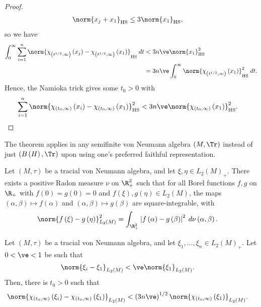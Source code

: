 \documentclass[10pt]{mypackage}
\begin{document}
\begin{proof}
  \begin{align*}
    \norm{x_j + x_1}_{\operatorname{HS}} &\leq 3\norm{x_1}_{\operatorname{HS}},
  \end{align*}
  so we have
  \begin{align*}
    \int_{0}^{\infty} \sum_{i=1}^{n}\norm{\chi_{\left( t^{1/2},\infty \right)}\left(x_j\right)-\chi_{\left( t^{1/2},\infty \right)}\left( x_1 \right)}_{\operatorname{HS}}\:dt &< 3n\ve \norm{x_1}_{\operatorname{HS}}^2\\
                                                                                                                                                                                                &= 3n\ve \int_{0}^{\infty} \norm{\chi_{\left( t^{1/2},\infty \right)}\left( x_1 \right)}_{\operatorname{HS}}^2\:dt.
  \end{align*}
  Hence, the Namioka trick gives some $t_0 > 0$ with
  \begin{align*}
    \sum_{i=1}^{n} \norm{\chi_{\left( t_0,\infty \right)}\left( x_i \right) - \chi_{\left( t_0,\infty \right)}\left( x_1 \right)}_{\operatorname{HS}}^2 &< 3n\ve\norm{\chi_{\left( t_0,\infty \right)}\left( x_1 \right)}_{\operatorname{HS}}^2.
  \end{align*}
\end{proof}
The theorem applies in any semifinite von Neumann algebra $\left( M,\Tr \right)$ instead of just $\left( B\left( H \right),\Tr \right)$ upon using one's preferred faithful representation.
\begin{proposition}
  Let $\left( M,\tau \right)$ be a tracial von Neumann algebra, and let $\xi,\eta\in L_2\left( M \right)_{+}$. There exists a positive Radon measure $\nu$ on $\R^2_{+}$ such that for all Borel functions $f,g$ on $\R_{+}$ with $f(0) = g(0) = 0$ and $f\left( \xi \right),g\left( \eta \right)\in L_2\left( M \right)$, the maps $\left( \alpha,\beta \right)\mapsto f\left( \alpha \right)$ and $\left( \alpha,\beta \right)\mapsto g\left( \beta \right)$ are square-integrable, with
  \begin{align*}
    \norm{f\left( \xi \right)-g\left( \eta \right)}_{L_2(M)}^2 &= \int_{\R^2_{+}}^{} \left\vert f\left( \alpha \right)-g\left( \beta \right) \right\vert^2\:d\nu\left( \alpha,\beta \right).
  \end{align*}
\end{proposition}
\begin{theorem}
  Let $\left( M,\tau \right)$ be a tracial von Neumann algebra, and let $\xi_1,\dots,\xi_n\in L_2\left( M \right)_{+}$. Let $0 < \ve < 1$ be such that
  \begin{align*}
    \norm{\xi_i - \xi_1}_{L_2(M)} &< \ve\norm{\xi_1}_{L_2(M)}.
  \end{align*}
  Then, there is $t_0 > 0$ such that
  \begin{align*}
    \norm{\chi_{\left( t_0,\infty \right)}\left( \xi_i \right) - \chi_{\left( t_0,\infty \right)}\left( \xi_1 \right)}_{L_2(M)} &< \left( 3n\ve \right)^{1/2} \norm{\chi_{\left( t_0,\infty \right)}\left( \xi_1 \right)}_{L_2(M)}.
  \end{align*}
\end{theorem}
\end{document}
